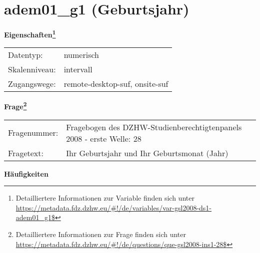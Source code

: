 
    \setcounter{footnote}{0}

    \vspace*{-1.8cm}
	\section{adem01\_g1 (Geburtsjahr)}
	\label{section:adem01_g1}



    \vspace*{0.5cm}
    \noindent\textbf{Eigenschaften\footnote{Detailliertere Informationen zur Variable finden sich unter
		\url{https://metadata.fdz.dzhw.eu/\#!/de/variables/var-gsl2008-ds1-adem01_g1$}}}\\
	\begin{tabularx}{\hsize}{@{}lX}
	Datentyp: & numerisch \\
	Skalenniveau: & intervall \\
	Zugangswege: &
	  remote-desktop-suf, 
	  onsite-suf
 \\
    \end{tabularx}



				\vspace*{0.5cm}
                \noindent\textbf{Frage\footnote{Detailliertere Informationen zur Frage finden sich unter
		              \url{https://metadata.fdz.dzhw.eu/\#!/de/questions/que-gsl2008-ins1-28$}}}\\
				\begin{tabularx}{\hsize}{@{}lX}
					Fragenummer: &
					  Fragebogen des DZHW-Studienberechtigtenpanels 2008 - erste Welle:
					  28
 \\
					Fragetext: & Ihr Geburtsjahr und Ihr Geburtsmonat (Jahr) \\
				\end{tabularx}





        		\vspace*{0.5cm}
                \noindent\textbf{Häufigkeiten}

